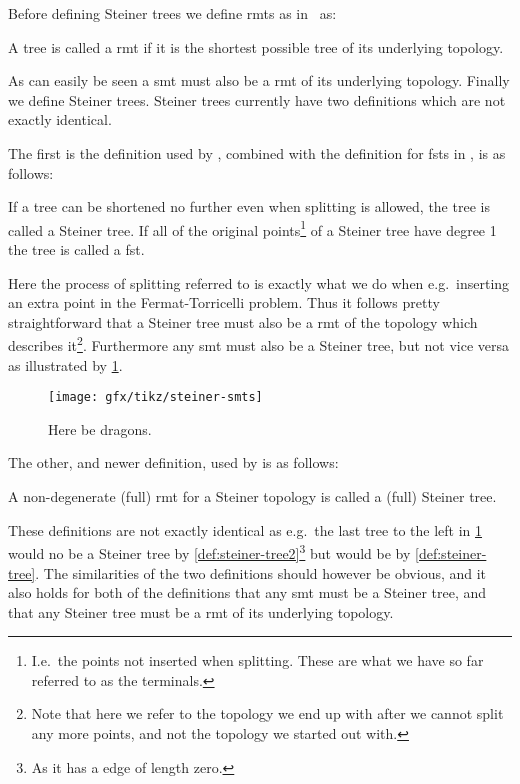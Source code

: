 Before defining Steiner trees we define \glspl{rmt} as in~\cite{gilbert1968}
as:
%
\begin{definition}
  A tree is called a \acrlong{rmt} if it is the shortest possible tree of its
  underlying topology.
\end{definition}
%
As can easily be seen a \gls{smt} must also be a \gls{rmt} of its underlying
topology. Finally we define Steiner trees. Steiner trees currently have two definitions
which are not exactly identical.

The first is the definition used by \textcite{gilbert1968}, combined with the
definition for \glspl{fst} in \textcite{smith1992}, is as follows:
%
\begin{definition}
  If a tree can be shortened no further even when splitting is allowed, the tree
  is called a Steiner tree. If all of the original points\footnote{I.e.\ the
    points not inserted when splitting. These are what we have so far referred
    to as the terminals.} of a Steiner tree have degree 1 the tree is called a \acrlong{fst}.\label{def:steiner-tree}
\end{definition}
%
Here the process of splitting referred to is exactly what we do when e.g.\
inserting an extra point in the Fermat-Torricelli problem. Thus it follows
pretty straightforward that a Steiner tree must also be a \gls{rmt} of the
topology which describes it\footnote{Note that here we refer to the topology we
  end up with after we cannot split any more points, and not the topology we
  started out with.}. Furthermore any \gls{smt} must also be a Steiner tree, but not
vice versa as illustrated by \cref{fig:steiner-smts}.
%
\begin{figure}[htbp]
\centering
\texttt{[image: gfx/tikz/steiner-smts]}
\caption[Here be dragons]{Here be dragons.\label{fig:steiner-smts}}
\end{figure}
%
The other, and newer definition, used by \textcite{brazil2015} is as follows:
%
\begin{definition}
  A non-degenerate (full) \gls{rmt} for a Steiner topology is called a (full)
  Steiner tree.\label{def:steiner-tree2}
\end{definition}
%
These definitions are not exactly identical as e.g.\ the last tree to the left in
\cref{fig:steiner-smts} would no be a Steiner tree by
\cref{def:steiner-tree2}\footnote{As it has a edge of length zero.}
but would be by \cref{def:steiner-tree}. The similarities of the two definitions
should however be obvious, and it also holds for both of the definitions that
any \gls{smt} must be a Steiner tree, and that any Steiner tree must be a
\gls{rmt} of its underlying topology.

